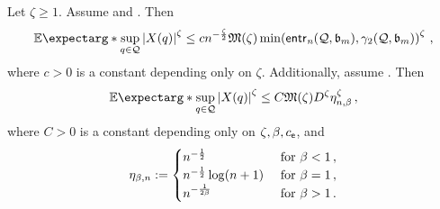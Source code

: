 \begin{lemma}\label{lmm:strong:close}	
	Let $\zeta \geq 1$.
	Assume  and .
	Then
	\begin{equation*}
		\Ex*{\sup_{q\in\mc Q} \abs{X(q)}^\zeta} \leq c n^{-\frac\zeta2} \mf M(\zeta) \min\brOf{\entrn(\mc Q, \mf b_m), \gamma_2(\mc Q, \mf b_m)}^\zeta
		\eqcm
	\end{equation*}
	where $c>0$ is a constant depending only on $\zeta$.
	Additionally, assume . Then
	\begin{equation*}
		\Ex*{\sup_{q\in\mc Q} \abs{X(q)}^\zeta} \leq  C \mf M(\zeta) D^\zeta \eta_{n,\beta}^\zeta
		\eqcm
	\end{equation*}
	where $C>0$ is a constant depending only on $\zeta, \beta, c_{\mathsf{e}}$, and
	\begin{equation*}
		\eta_{\beta,n} := 
		\begin{cases} 
			n^{-\frac12} & \text{ for }\beta < 1\, ,\\
			n^{-\frac12} \log(n+1) & \text{ for } \beta = 1\, ,\\
			n^{-\frac1{2\beta}} & \text{ for } \beta > 1\, .
		\end{cases} 
	\end{equation*}
\end{lemma}
%

